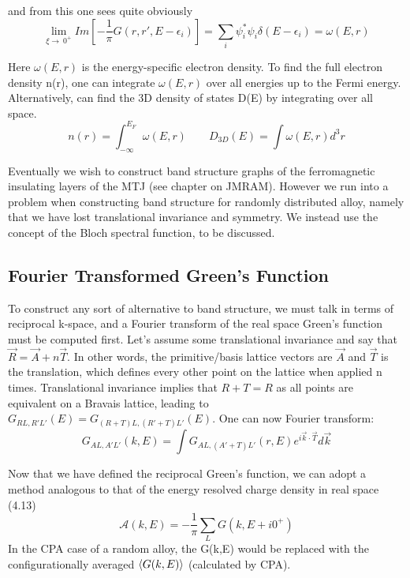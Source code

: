 \documentclass[12pt]{article}
\begin{document}
and from this one sees quite obviously
\begin{equation} \label{4.1} \tag{4.13}
\lim_{\xi\to\ 0^+}Im[-\frac{1}{\pi}G(r,r',E-\epsilon_i)]=\sum_i \psi^*_i\psi_i \delta(E-\epsilon_i)=\omega(E,r)
\end{equation}


Here $\omega(E,r)$ is the energy-specific electron density. To find the full electron density n(r), one can integrate $\omega(E,r)$ over all energies up to the Fermi energy. Alternatively, can find the 3D density of states D(E) by integrating over all space. 
\begin{equation} \label{4.1} \tag{4.14}
n(r)=\int_{-\infty}^{E_F}\omega(E,r) \qquad D_{3D}(E)=\int \omega(E,r) d^3r
\end{equation}

Eventually we wish to construct band structure graphs of the ferromagnetic insulating layers of the MTJ (see chapter on JMRAM). However we run into a problem when constructing band structure for randomly distributed alloy, namely that we have lost translational invariance and symmetry. We instead use the concept of the Bloch spectral function, to be discussed.

\subsection{Fourier Transformed Green's Function}

To construct any sort of alternative to band structure, we must talk in terms of reciprocal k-space, and a Fourier transform of the real space Green's function must be computed first. Let's assume some translational invariance and say that $\vec{R}=\vec{A}+n\vec{T}$. In other words, the primitive/basis lattice vectors are $\vec{A}$ and $\vec{T}$ is the translation, which defines every other point on the lattice when applied n times. Translational invariance implies that $R+T=R$ as all points are equivalent on a Bravais lattice, leading to $G_{RL,R'L'}(E)=G_{(R+T)L,(R'+T)L'}(E)$. One can now Fourier transform:
\begin{equation} \label{4.1} \tag{4.15}
G_{AL,A'L'}(k,E)=\int G_{AL,(A'+T)L'}(r,E)e^{i\vec{k}\cdot \vec{T}} d\vec{k}
\end{equation}

Now that we have defined the reciprocal Green's function, we can adopt a method analogous to that of the energy resolved charge density in real space (4.13)
\begin{equation} \label{4.1} \tag{4.16}
\mathcal{A}(k,E)=-\frac{1}{\pi} \sum_L G(k,E+i0^+)
\end{equation}
In the CPA case of a random alloy, the G(k,E) would be replaced with the configurationally averaged $\expval{G(k,E)}$ (calculated by CPA).
\end{document}
